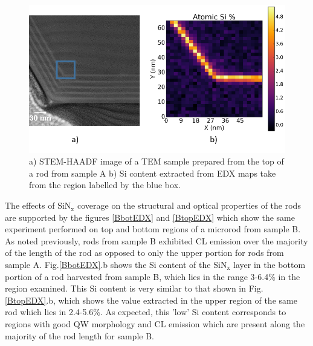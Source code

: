 \begin{figure}[!h]
	\centering
	\includegraphics[width=1\textwidth]{Figs/Ch6/A-top-EDX}
	\caption{a) STEM-HAADF image of a TEM sample prepared from the top of a rod from sample A b) Si content extracted from EDX maps take from the region labelled by the blue box.}
	\label{AtopEDX}
\end{figure}
\FloatBarrier 

The effects of $\mathrm{SiN_{x}}$ coverage on the structural and optical properties of the rods are supported by the figures \ref{BbotEDX} and \ref{BtopEDX} which show the same experiment performed on top and bottom regions of a microrod from sample B. As noted previously, rods from sample B exhibited CL emission over the majority of the length of the rod as opposed to only the upper portion for rods from sample A. Fig.\ref{BbotEDX}.b shows the Si content of the $\mathrm{SiN_{x}}$ layer in the bottom portion of a rod harvested from sample B, which lies in the range 3-6.4\% in the region examined. This Si content is very similar to that shown in Fig.\ref{BtopEDX}.b, which shows the value extracted in the upper region of the same rod which lies in 2.4-5.6\%. As expected, this 'low' Si content corresponds to regions with good QW morphology and CL emission which are present along the majority of the rod length for sample B.

